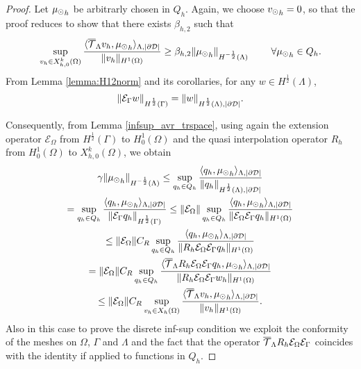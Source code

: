 \begin{proof}
Let ${\mu_{\odot}}_h$ be arbitrarly chosen in $Q_h$. Again, we choose ${v_{\odot}}_h =0$, so that the proof reduces to show that there exists $\beta_{h,2}$ such that
\begin{equation*}
\sup_{v_h \in X_{h,0}^k(\Omega)} \frac{ \langle {\overline{\mathcal{T}}_\Lambda} v_h , {\mu_{\odot}}_h \rangle _{\Lambda,|\partial\mathcal{D}|} } {\|v_h\|_{H^1(\Omega)} }\geq \beta_{h,2} \|{\mu_{\odot}}_h\|_{H^{-\frac 12}(\Lambda)}\ \qquad \forall {\mu_{\odot}}_h \in Q_h.
\end{equation*}
From Lemma \ref{lemma:H12norm} and its corollaries, for any $w \in H^{\frac 12}(\Lambda)$,
\begin{equation*}
\|\mathcal{E}_\Gamma w\|_{H^{\frac 12}(\Gamma)}= \|w\|_{H^{\frac 12}(\Lambda),|\partial\mathcal{D}|}.
\end{equation*}

Consequently, from Lemma \ref{infsup_avr_trspace}, using again the extension operator $\mathcal{E}_{\Omega}$ from $H^{\frac 12}(\Gamma)$ to $H^1_0(\Omega)$ and the quasi interpolation operator $R_h$ from $H^1_0(\Omega)$ to $X_{h,0}^k(\Omega)$, we obtain
\begin{multline}
\gamma \|{\mu_{\odot}}_h\|_{H^{-\frac 12}(\Lambda)} \leq 
\sup_{q_h \in Q_h} \frac{ \langle q_h, {\mu_{\odot}}_h \rangle_{\Lambda,|\partial\mathcal{D}|} } {\|q_h\|_{H^{\frac 12}(\Lambda),|\partial\mathcal{D}|}} 
\\
=  \sup_{q_h \in Q_h} \frac{ \langle q_h, {\mu_{\odot}}_h \rangle _{\Lambda,|\partial\mathcal{D}|}} {\|\mathcal{E}_\Gamma q_h\|_{H^{\frac 12}(\Gamma)}} 
\leq \|\mathcal{E}_{\Omega}\| \sup_{q_h \in Q_h} \frac{ \langle q_h, {\mu_{\odot}}_h \rangle _{\Lambda,|\partial\mathcal{D}|} } {\|\mathcal{E}_{\Omega} \mathcal{E}_\Gamma q_h\|_{H^1(\Omega)}} 
\\
\leq \|\mathcal{E}_{\Omega}\| C_R \sup_{q_h \in Q_h} \frac{ \langle q_h, {\mu_{\odot}}_h \rangle _{\Lambda,|\partial\mathcal{D}|} } {\|R_h \mathcal{E}_{\Omega} \mathcal{E}_\Gamma q_h\|_{H^1(\Omega)}}
\\ 
=  \|\mathcal{E}_{\Omega}\| C_R \sup_{q_h \in Q_h} \frac{ \langle 	{\overline{\mathcal{T}}_\Lambda} R_h \mathcal{E}_{\Omega} \mathcal{E}_\Gamma q_h, {\mu_{\odot}}_h \rangle _{\Lambda,|\partial\mathcal{D}|}} {\|R_h \mathcal{E}_{\Omega} \mathcal{E}_\Gamma w_h\|_{H^1(\Omega)}}
\\
\leq \|\mathcal{E}_{\Omega}\| C_R \sup_{v_h \in X_h(\Omega)} \frac{ \langle {\overline{\mathcal{T}}_\Lambda} v_h, {\mu_{\odot}}_h \rangle _{\Lambda,|\partial\mathcal{D}|}} {\|v_h\|_{H^1(\Omega)}}. 
\end{multline}
Also in this case to prove the disrete inf-sup condition we exploit the conformity of the meshes on $\Omega$, $\Gamma$ and $\Lambda$ and the fact that the operator ${\overline{\mathcal{T}}_\Lambda} R_h \mathcal{E}_{\Omega} \mathcal{E}_\Gamma$ coincides with the identity if applied to functions in $Q_h$. 
\end{proof}